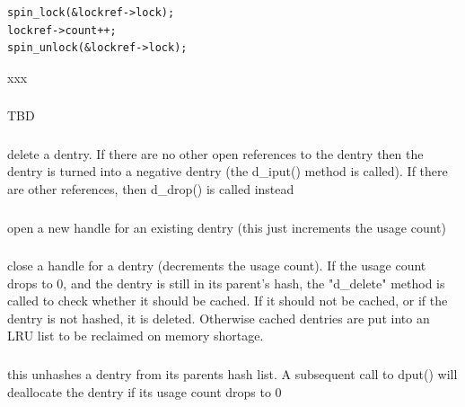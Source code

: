 \begin{lstlisting}
spin_lock(&lockref->lock);
lockref->count++;
spin_unlock(&lockref->lock);
\end{lstlisting}

\noindent
xxx


\subsubsection{}

TBD

\subsubsection{}

delete a dentry. If there are no other open references to the dentry then the dentry is turned into a negative dentry (the d\_iput() method is called). If there are other references, then d\_drop() is called instead

\subsubsection{}

open a new handle for an existing dentry (this just increments the usage count)

\subsubsection{}

close a handle for a dentry (decrements the usage count). If the usage count drops to 0, and  the dentry is still in its parent's hash, the "d\_delete" method is called to check whether it should be cached. If it  should not be cached, or if the dentry is not hashed, it is deleted. Otherwise cached dentries are put into an LRU list to be reclaimed on memory shortage.
		
\subsubsection{}

this unhashes a dentry from its parents hash list. A subsequent call to dput() will deallocate the dentry if its usage count drops to 0
		
\subsubsection{}

